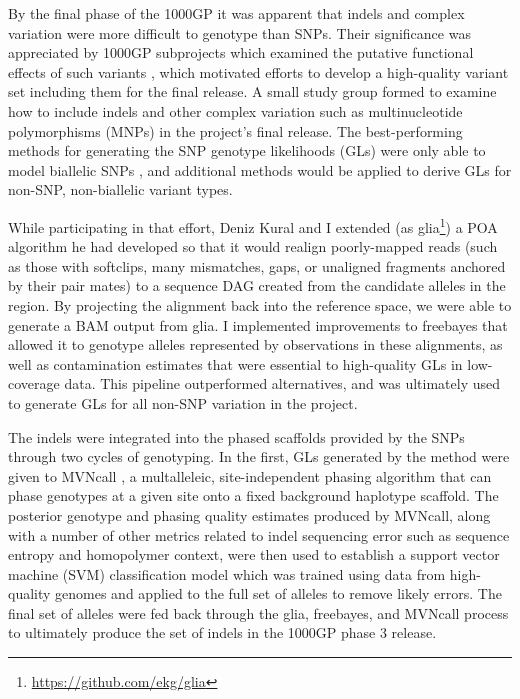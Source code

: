 By the final phase of the 1000GP \cite{1000g2015} it was apparent that indels and complex variation were more difficult to genotype than SNPs.
Their significance was appreciated by 1000GP subprojects which examined the putative functional effects of such variants \cite{challis2015distribution}, which motivated efforts to develop a high-quality variant set including them for the final release.
A small study group formed to examine how to include indels and other complex variation such as multinucleotide polymorphisms (MNPs) in the project's final release.
The best-performing methods for generating the SNP genotype likelihoods (GLs) were only able to model biallelic SNPs \cite{snptools}, and additional methods would be applied to derive GLs for non-SNP, non-biallelic variant types.

While participating in that effort, Deniz Kural and I extended (as glia\footnote{\url{https://github.com/ekg/glia}}) a POA algorithm he had developed so that it would realign poorly-mapped reads (such as those with softclips, many mismatches, gaps, or unaligned fragments anchored by their pair mates) to a sequence DAG created from the candidate alleles in the region.
By projecting the alignment back into the reference space, we were able to generate a BAM output from glia.
I implemented improvements to freebayes that allowed it to genotype alleles represented by observations in these alignments, as well as contamination estimates that were essential to high-quality GLs in low-coverage data.
This pipeline outperformed alternatives, and was ultimately used to generate GLs for all non-SNP variation in the project.

The indels were integrated into the phased scaffolds provided by the SNPs through two cycles of genotyping.
In the first, GLs generated by the method were given to MVNcall \cite{menelaou2012genotype}, a multalleleic, site-independent phasing algorithm that can phase genotypes at a given site onto a fixed background haplotype scaffold.
The posterior genotype and phasing quality estimates produced by MVNcall, along with a number of other metrics related to indel sequencing error such as sequence entropy and homopolymer context, were then used to establish a support vector machine (SVM) classification model which was trained using data from high-quality genomes and applied to the full set of alleles to remove likely errors.
The final set of alleles were fed back through the glia, freebayes, and MVNcall process to ultimately produce the set of indels in the 1000GP phase 3 release.

